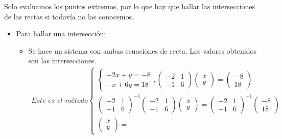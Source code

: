 \documentclass[12pt, twoside, openright]{report} %
\begin{document}
Solo evaluamos los puntos extremos, por lo que hay que hallar las
intersecciones de las rectas si todavía no las conocemos.
\begin{itemize}
	\item Para hallar una intersección:
	      \begin{itemize}
		      \item Se hace un sistema con ambas
		            ecuaciones de recta. Los valores obtenidos son las intersecciones.
		            \begin{eqnarray*}
			            \textit{Este es el método}\left\{\begin{matrix}
				            \left\{\begin{matrix}
					            -2x+y=-8 \\
					            -x+6y=18
				            \end{matrix}\right.
				            ,
				            \begin{pmatrix}
					            -2 & 1 \\
					            -1 & 6
				            \end{pmatrix}
				            \begin{pmatrix}
					            x \\
					            y
				            \end{pmatrix}
				            =
				            \begin{pmatrix}
					            -8 \\
					            18
				            \end{pmatrix}               \\
				            \begin{pmatrix}
					            -2 & 1 \\
					            -1 & 6
				            \end{pmatrix}^{-1}
				            \begin{pmatrix}
					            -2 & 1 \\
					            -1 & 6
				            \end{pmatrix}
				            \begin{pmatrix}
					            x \\
					            y
				            \end{pmatrix}
				            =
				            \begin{pmatrix}
					            -2 & 1 \\
					            -1 & 6
				            \end{pmatrix}^{-1}
				            \begin{pmatrix}
					            -8 \\
					            18
				            \end{pmatrix}               \\
				            \begin{pmatrix}
					            x \\
					            y
				            \end{pmatrix}
				            =


\end{matrix}
\end{eqnarray*}
\end{itemize}
\end{itemize}
\end{document}
